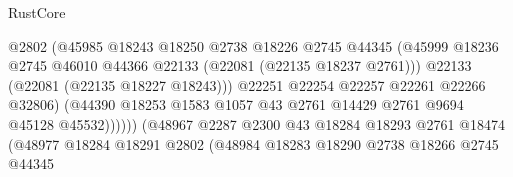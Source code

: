 \begin{lexlean}{RustCore}
\begin{coremodule}
                                            @2802
                                            (@45985
                                              @18243
                                              @18250
                                              @2738
                                              @18226
                                              @2745
                                              @44345
                                              (@45999
                                                @18236
                                                @2745
                                                @46010
                                                @44366
                                                @22133
                                                (@22081 (@22135 @18237 @2761)))
                                              @22133
                                              (@22081 (@22135 @18227 @18243)))
                                            @22251
                                            @22254
                                            @22257
                                            @22261
                                            @22266
                                            @32806)
                                          (@44390
                                            @18253
                                            @1583
                                            @1057
                                            @43
                                            @2761
                                            @14429
                                            @2761
                                            @9694
                                            @45128
                                            @45532))))))
                                (@48967
                                  @2287
                                  @2300
                                  @43
                                  @18284
                                  @18293
                                  @2761
                                  @18474
                                  (@48977
                                    @18284
                                    @18291
                                    @2802
                                    (@48984
                                      @18283
                                      @18290
                                      @2738
                                      @18266
                                      @2745
                                      @44345

\end{coremodule}
\end{lexlean}
